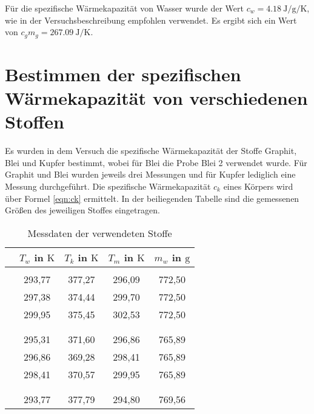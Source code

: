 Für die spezifische Wärmekapazität von Wasser wurde der Wert $c_w =
\SI{4,18}{\joule\per\gram\per\kelvin}$, wie in der Versuchsbeschreibung
\cite{anleitung} empfohlen verwendet.
Es ergibt sich ein Wert von $c_gm_g = \SI{267,09}{\joule\per\kelvin}$.

\section{Bestimmen der spezifischen Wärmekapazität von verschiedenen Stoffen}

Es wurden in dem Versuch die spezifische Wärmekapazität der Stoffe Graphit,
Blei und Kupfer bestimmt, wobei für Blei die Probe Blei 2 verwendet wurde.
Für Graphit und Blei wurden jeweils drei Messungen und für Kupfer lediglich eine
Messung durchgeführt. Die spezifische Wärmekapazität $c_k$ eines Körpers
wird über Formel \eqref{eqn:ck} ermittelt. In der beiliegenden Tabelle sind die gemessenen
Größen des jeweiligen Stoffes eingetragen.

\begin{table}
 \centering
 \label{tab:Messdaten1}
 \begin{tabular}[width=0.4\textwidth]{S S[table-format=3.2] S[table-format=3.2]
   S[table-format=3.2] S[table-format=3.2]}
     \toprule
     {}  & {$T_w$ in $\si{\kelvin}$} & {$T_k$ in $\si{\kelvin}$} &
     {$T_m$ in $\si{\kelvin}$} & {$m_w$ in $\si{\gram}$} \\
     \midrule
      & & & & \\
      & 293,77 & 377,27 & 296,09 & 772,50 \\
      & 297,38 & 374,44 & 299,70 & 772,50 \\
      & 299,95 & 375,45 & 302,53 & 772,50 \\
     & & & & \\
      & & & & \\
      & 295,31 & 371,60 & 296,86 & 765,89 \\
      & 296,86 & 369,28 & 298,41 & 765,89 \\
      & 298,41 & 370,57 & 299,95 & 765,89 \\
     & & & & \\
      & & & & \\
      & 293,77 & 377,79 & 294,80 & 769,56 \\
     \bottomrule
\end{tabular}
  \caption{Messdaten der verwendeten Stoffe}
\end{table}
\FloatBarrier

